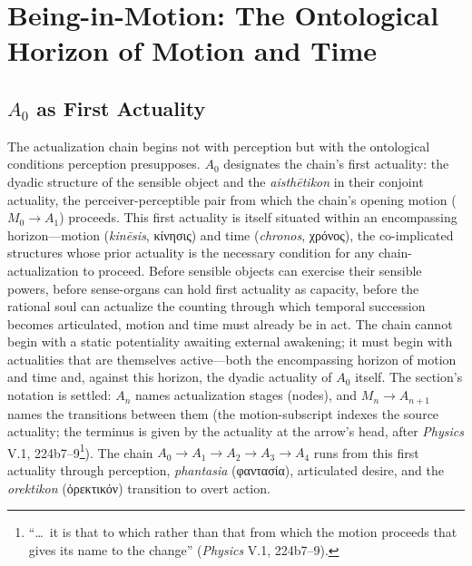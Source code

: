 \documentclass{article}
\newcommand{\gk}[1]{{\greekfont #1}}
\begin{document}
\section{Being-in-Motion: The Ontological Horizon of Motion and Time}

\subsection{$A_0$ as First Actuality}

The actualization chain begins not with perception but with the ontological conditions perception presupposes. $A_0$ designates the chain's first actuality: the dyadic structure of the sensible object and the \textit{aisthētikon} in their conjoint actuality, the perceiver-perceptible pair from which the chain's opening motion ($M_0 \rightarrow A_1$) proceeds. This first actuality is itself situated within an encompassing horizon---motion (\textit{kinēsis}, \gk{κίνησις}) and time (\textit{chronos}, \gk{χρόνος}), the co-implicated structures whose prior actuality is the necessary condition for any chain-actualization to proceed. Before sensible objects can exercise their sensible powers, before sense-organs can hold first actuality as capacity, before the rational soul can actualize the counting through which temporal succession becomes articulated, motion and time must already be in act. The chain cannot begin with a static potentiality awaiting external awakening; it must begin with actualities that are themselves active---both the encompassing horizon of motion and time and, against this horizon, the dyadic actuality of $A_0$ itself. The section's notation is settled: $A_n$ names actualization stages (nodes), and $M_n \rightarrow A_{n+1}$ names the transitions between them (the motion-subscript indexes the source actuality; the terminus is given by the actuality at the arrow's head, after \textit{Physics} V.1, 224b7--9\footnote{``\ldots\ it is that to which rather than that from which the motion proceeds that gives its name to the change'' (\textit{Physics} V.1, 224b7--9).}). The chain $A_0 \rightarrow A_1 \rightarrow A_2 \rightarrow A_3 \rightarrow A_4$ runs from this first actuality through perception, \textit{phantasia} (\gk{φαντασία}), articulated desire, and the \textit{orektikon} (\gk{ὀρεκτικόν}) transition to overt action.
\end{document}
